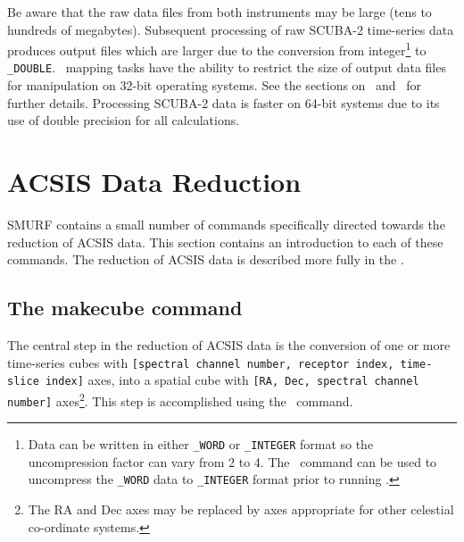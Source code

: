 \documentclass[oneside,11pt]{starlink}
\begin{document}
Be aware that the raw data files from both instruments may be large
(tens to hundreds of megabytes). Subsequent processing of raw SCUBA-2
time-series data produces output files which are larger due to the
conversion from integer\footnote{Data can be written in either
  \texttt{\_WORD} or \texttt{\_INTEGER} format so the uncompression
  factor can vary from 2 to 4. The \rawunpress\ command can be used to
  uncompress the \texttt{\_WORD} data to \texttt{\_INTEGER} format
  prior to running \flatfield.}  to \verb+_DOUBLE+. \SMURF\ mapping
tasks have the ability to restrict the size of output data files for
manipulation on 32-bit operating systems. See the sections on
\makemap\ and \makecube\ for further details. Processing
SCUBA-2 data is faster on 64-bit systems due to its use of double
precision for all calculations.

\section{ACSIS Data Reduction\label{se:acsisdr}}

SMURF contains a small number of commands specifically directed towards
the reduction of ACSIS data. This section contains an introduction to
each of these commands. The reduction of ACSIS data is described
more fully in the . 

\subsection{The makecube command}

The central step in the reduction of ACSIS data is the conversion of one
or more time-series cubes with \texttt{[spectral channel number, receptor
index, time-slice index]} axes, into a spatial cube with \texttt{[RA, Dec, spectral channel number]} axes\footnote{The RA and Dec axes may
be replaced by axes appropriate for other celestial co-ordinate
systems.}. This step is accomplished using the \makecube\ command.
\end{document}
